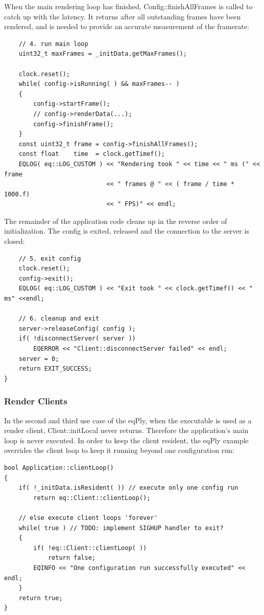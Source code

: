 \documentclass[10pt,a4]{scrartcl}
\begin{document}
When the main rendering loop has finished,
\textsf{Config::finishAllFrames} is called to catch up with the
latency. It returns after all outstanding frames have been rendered, and
is needed to provide an accurate measurement of the framerate:

{\footnotesize\begin{lstlisting}
    // 4. run main loop
    uint32_t maxFrames = _initData.getMaxFrames();
    
    clock.reset();
    while( config->isRunning( ) && maxFrames-- )
    {
        config->startFrame();
        // config->renderData(...);
        config->finishFrame();
    }
    const uint32_t frame = config->finishAllFrames();
    const float    time  = clock.getTimef();
    EQLOG( eq::LOG_CUSTOM ) << "Rendering took " << time << " ms (" << frame
                            << " frames @ " << ( frame / time * 1000.f)
                            << " FPS)" << endl;
\end{lstlisting}}%

The remainder of the application code cleans up in the reverse order of
initialization. The config is exited, released and the connection to
the server is closed:

{\footnotesize\begin{lstlisting}
    // 5. exit config
    clock.reset();
    config->exit();
    EQLOG( eq::LOG_CUSTOM ) << "Exit took " << clock.getTimef() << " ms" <<endl;

    // 6. cleanup and exit
    server->releaseConfig( config );
    if( !disconnectServer( server ))
        EQERROR << "Client::disconnectServer failed" << endl;
    server = 0;
    return EXIT_SUCCESS;
}
\end{lstlisting}}%

\subsubsection{Render Clients}

In the second and third use case of the \textsf{eqPly}, when the
executable is used as a render client, \textsf{Client::initLocal} never
returns. Therefore the application's main loop is never executed. In
order to keep the client resident, the \textsf{eqPly} example overrides
the client loop to keep it running beyond one configuration run:

{\footnotesize\begin{lstlisting}
bool Application::clientLoop()
{
    if( !_initData.isResident( )) // execute only one config run
        return eq::Client::clientLoop();

    // else execute client loops 'forever'
    while( true ) // TODO: implement SIGHUP handler to exit?
    {
        if( !eq::Client::clientLoop( ))
            return false;
        EQINFO << "One configuration run successfully executed" << endl;
    }
    return true;
}
\end{lstlisting}}%
\end{document}
